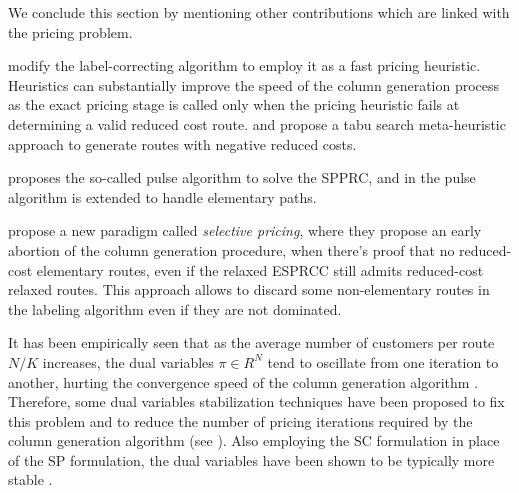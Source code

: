 \medskip

We conclude this section by mentioning other contributions
which are linked with the pricing problem.

\textcite{fukasawa2006} modify the label-correcting
algorithm to employ it as a fast pricing heuristic.
Heuristics can substantially improve the speed of the column generation process
as the exact pricing stage is called only when the pricing heuristic
fails at determining a valid reduced cost route.
\textcite{desaulniers2008} and \textcite{archetti2011} propose a tabu search
meta-heuristic approach to generate routes with negative reduced costs.

\textcite{lozano2013} proposes the so-called pulse algorithm
to solve the SPPRC, and in \textcite{lozano2016} the pulse algorithm
is extended to handle elementary paths.

\textcite{desaulniers2019} propose a new paradigm called \textit{selective pricing},
where they propose an early abortion of the column generation procedure,
when there's proof that no reduced-cost elementary routes,
even if the relaxed ESPRCC still admits reduced-cost relaxed routes.
This approach allows to discard some non-elementary routes
in the labeling algorithm even if they are not dominated.

It has been empirically seen that
as the average number of customers per route $N / K$ increases,
the dual variables $\pi \in R^N$ tend to oscillate from one iteration to another,
hurting the convergence speed of the column generation algorithm \parencite{toth2014}.
Therefore, some dual variables stabilization techniques
have been proposed to fix this problem and
to reduce the number of pricing iterations required
by the column generation algorithm (see \cite{dumerle1999, rousseau2007, pessoa2013, pessoa2018}).
Also employing the SC formulation in place of the SP formulation,
the dual variables have been shown to be typically more stable \parencite{rousseau2007, feillet2010}.




